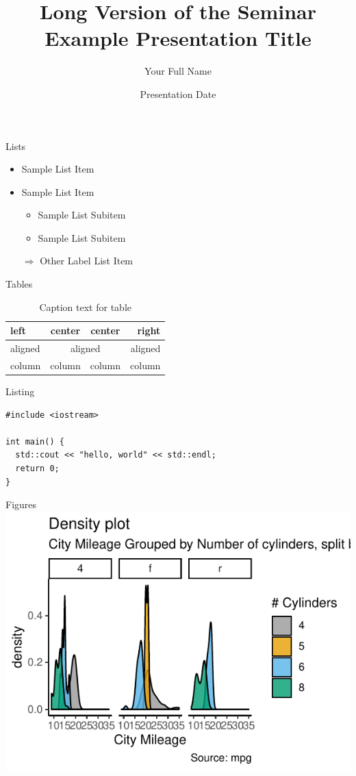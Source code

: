 \documentclass{beamer}
\title[Seminar Example Presentation]{Long Version of the Seminar Example Presentation Title}
\author[Short Name]{Your Full Name}
\institute{Technische Universität München}
\date{Presentation Date}
\begin{document}
\maketitle

\begin{frame}{Lists}
\begin{itemize}
	\item Sample List Item
	\item Sample List Item
	\begin{itemize}
		\item Sample List Subitem
		\item Sample List Subitem
	\end{itemize}
	
	\item[$\Rightarrow$] Other Label List Item
\end{itemize}
\end{frame}

\begin{frame}{Tables}
\centering
\begin{table}
\begin{tabular}{@{::}l|c|c|r@{::}}
	\hline 
	left & center & center & right \\ 
	\hline 
	aligned & \multicolumn{2}{c|}{aligned} & aligned \\ 
	\hline 
	column & column & column & column \\ 
	\hline 
\end{tabular}

\label{tab1}
\caption{Caption text for table} 
\end{table}
\end{frame}

\begin{frame}[fragile=singleslide]{Listing}
\begin{verbatim}
#include <iostream>

int main() {
  std::cout << "hello, world" << std::endl;
  return 0;
}
\end{verbatim}
\end{frame}

\begin{frame}{Figures}
\includegraphics{example.pdf}
\end{frame}
\end{document}
